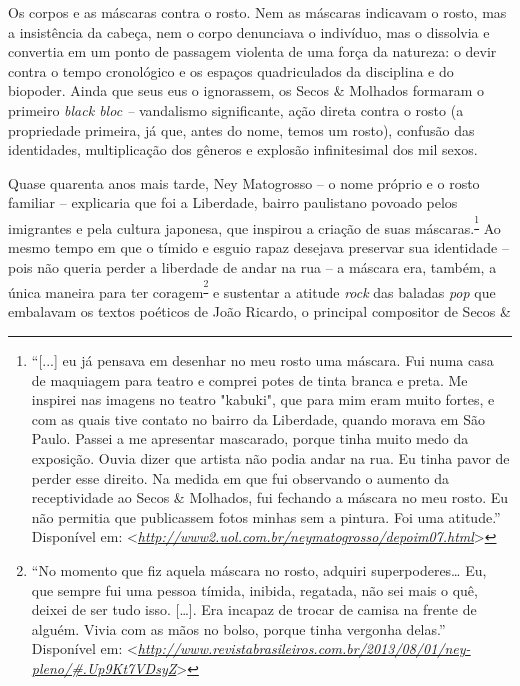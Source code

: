 Os corpos e as máscaras contra o rosto. Nem as máscaras indicavam o
rosto, mas a insistência da cabeça, nem o corpo denunciava o indivíduo,
mas o dissolvia e convertia em um ponto de passagem violenta de uma
força da natureza: o devir contra o tempo cronológico e os espaços
quadriculados da disciplina e do biopoder. Ainda que seus eus o
ignorassem, os Secos \& Molhados formaram o primeiro \emph{black bloc --
}vandalismo significante, ação direta contra o rosto (a propriedade
primeira, já que, antes do nome, temos um rosto), confusão das
identidades, multiplicação dos gêneros e explosão infinitesimal dos mil
sexos.

Quase quarenta anos mais tarde, Ney Matogrosso -- o nome próprio e o
rosto familiar -- explicaria que foi a Liberdade, bairro paulistano
povoado pelos imigrantes e pela cultura japonesa, que inspirou a criação
de suas máscaras.\textsuperscript{\footnote{``{[}...{]} eu já pensava em
  desenhar no meu rosto uma máscara. Fui numa casa de maquiagem para
  teatro e comprei potes de tinta branca e preta. Me inspirei nas
  imagens no teatro "kabuki", que para mim eram muito fortes, e com as
  quais tive contato no bairro da Liberdade, quando morava em São Paulo.
  Passei a me apresentar mascarado, porque tinha muito medo da
  exposição. Ouvia dizer que artista não podia andar na rua. Eu tinha
  pavor de perder esse direito. Na medida em que fui observando o
  aumento da receptividade ao Secos \& Molhados, fui fechando a máscara
  no meu rosto. Eu não permitia que publicassem fotos minhas sem a
  pintura. Foi uma atitude.'' Disponível em:
  \textless{}\href{http://www2.uol.com.br/neymatogrosso/depoim07.html}{\emph{http://www2.uol.com.br/neymatogrosso/depoim07.html}}\textgreater{}}}
Ao mesmo tempo em que o tímido e esguio rapaz desejava preservar sua
identidade -- pois não queria perder a liberdade de andar na rua -- a
máscara era, também, a única maneira para ter
coragem\textsuperscript{\footnote{``No momento que fiz aquela máscara no
  rosto, adquiri superpoderes\ldots{} Eu, que sempre fui uma pessoa
  tímida, inibida, regatada, não sei mais o quê, deixei de ser tudo
  isso. {[}\ldots{}{]}. Era incapaz de trocar de camisa na frente de
  alguém. Vivia com as mãos no bolso, porque tinha vergonha delas.''
  Disponível em:
  \textless{}\href{http://www.revistabrasileiros.com.br/2013/08/01/ney-pleno/\#.Up9Kt7VDsyZ}{\emph{\emph{http://www.revistabrasileiros.com.br/2013/08/01/ney-pleno/\#.Up9Kt7VDsyZ}}}\textgreater{}}}
e sustentar a atitude \emph{rock} das baladas \emph{pop }que embalavam
os textos poéticos de João Ricardo, o principal compositor de Secos \&
